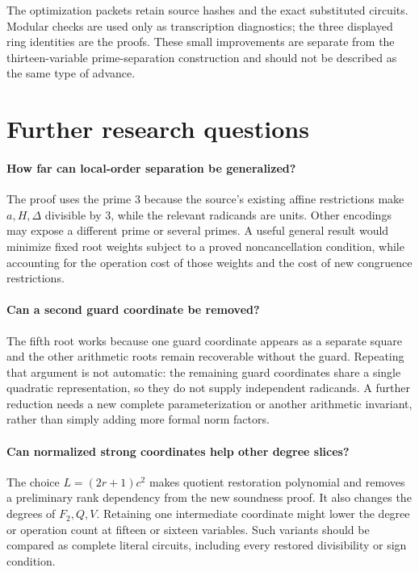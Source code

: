 \documentclass[11pt]{article}
\theoremstyle{definition}
\theoremstyle{remark}
\begin{document}
The optimization packets retain source hashes and the exact substituted
circuits. Modular checks are used only as transcription diagnostics;
the three displayed ring identities are the proofs. These small
improvements are separate from the thirteen-variable prime-separation
construction and should not be described as the same type of advance.

\section{Further research questions}
\label{sec:future}

\paragraph{How far can local-order separation be generalized?}
The proof uses the prime \(3\) because the source's existing affine
restrictions make \(a,H,\Delta\) divisible by \(3\), while the relevant
radicands are units. Other encodings may expose a different prime or
several primes. A useful general result would minimize fixed root weights
subject to a proved noncancellation condition, while accounting for
the operation cost of those weights and the cost of new congruence
restrictions.

\paragraph{Can a second guard coordinate be removed?}
The fifth root works because one guard coordinate appears as a separate
square and the other arithmetic roots remain recoverable without the
guard. Repeating that argument is not automatic: the remaining guard
coordinates share a single quadratic representation, so they do not
supply independent radicands. A further reduction needs a new complete
parameterization or another arithmetic invariant, rather than simply
adding more formal norm factors.

\paragraph{Can normalized strong coordinates help other degree slices?}
The choice \(L=(2r+1)c^2\) makes quotient restoration polynomial and
removes a preliminary rank dependency from the new soundness proof.
It also changes the degrees of \(F_2,Q,V\). Retaining one intermediate
coordinate might lower the degree or operation count at fifteen or
sixteen variables. Such variants should be compared as complete literal
circuits, including every restored divisibility or sign condition.
\end{document}
